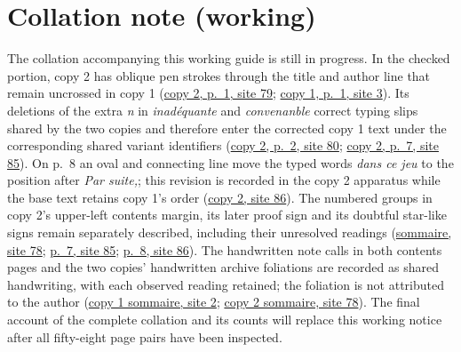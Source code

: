 \section*{Collation note (working)}
The collation accompanying this working guide is still in progress. In the checked portion, copy 2 has oblique pen strokes through the title and author line that remain uncrossed in copy 1 (\href{https://grothendieck.umontpellier.fr/web/viewer.html?file=../119.pdf\#page=80}{copy 2, p.~1, site 79}; \href{https://grothendieck.umontpellier.fr/web/viewer.html?file=../119.pdf\#page=4}{copy 1, p.~1, site 3}). Its deletions of the extra \textit{n} in \textit{inadéquante} and \textit{convenanble} correct typing slips shared by the two copies and therefore enter the corrected copy 1 text under the corresponding shared variant identifiers (\href{https://grothendieck.umontpellier.fr/web/viewer.html?file=../119.pdf\#page=81}{copy 2, p.~2, site 80}; \href{https://grothendieck.umontpellier.fr/web/viewer.html?file=../119.pdf\#page=86}{copy 2, p.~7, site 85}). On p.~8 an oval and connecting line move the typed words \textit{dans ce jeu} to the position after \textit{Par suite,}; this revision is recorded in the copy 2 apparatus while the base text retains copy 1's order (\href{https://grothendieck.umontpellier.fr/web/viewer.html?file=../119.pdf\#page=87}{copy 2, site 86}). The numbered groups in copy 2's upper-left contents margin, its later proof sign and its doubtful star-like signs remain separately described, including their unresolved readings (\href{https://grothendieck.umontpellier.fr/web/viewer.html?file=../119.pdf\#page=79}{sommaire, site 78}; \href{https://grothendieck.umontpellier.fr/web/viewer.html?file=../119.pdf\#page=86}{p.~7, site 85}; \href{https://grothendieck.umontpellier.fr/web/viewer.html?file=../119.pdf\#page=87}{p.~8, site 86}). The handwritten note calls in both contents pages and the two copies' handwritten archive foliations are recorded as shared handwriting, with each observed reading retained; the foliation is not attributed to the author (\href{https://grothendieck.umontpellier.fr/web/viewer.html?file=../119.pdf\#page=3}{copy 1 sommaire, site 2}; \href{https://grothendieck.umontpellier.fr/web/viewer.html?file=../119.pdf\#page=79}{copy 2 sommaire, site 78}). The final account of the complete collation and its counts will replace this working notice after all fifty-eight page pairs have been inspected.
